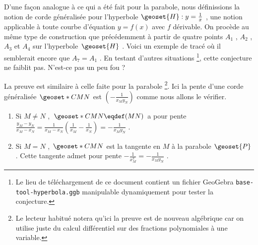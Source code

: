 D'une façon analogue à ce qui a été fait pour la parabole, nous définissions la notion de corde généralisée pour l'hyperbole $\geoset{H} : y = \frac{1}{x}$ , une notion applicable à toute courbe d'équation $y = f(x)$ avec $f$ dérivable.
On procède au même type de construction que précédemment à partir de quatre points $A_1$ , $A_2$ , $A_3$ et $A_4$ sur l'hyperbole $\geoset{H}$ . Voici un exemple de tracé où il semblerait encore que $A_7 = A_1$ . En testant d'autres situations
\footnote{
	Le lieu de téléchargement de ce document contient un fichier GeoGebra \texttt{base-tool-hyperbola.ggb} manipulable dynamiquement pour tester la conjecture.
},
cette conjecture ne faiblit pas. N'est-ce pas un peu fou ?
 

\vspace{1em}

\begin{center}
\end{center}

\vspace{1em}

 
La preuve est similaire à celle faite pour la parabole
\footnote{
	Le lecteur habitué notera qu'ici la preuve est de nouveau algébrique car on utilise juste du calcul différentiel sur des fractions polynomiales à une variable.
}.
Ici la pente d'une corde généralisée $\geoset*{C}{MN}$ est $\left( - \frac{1}{x_M y_N} \right)$ comme nous allons le vérifier.
\begin{enumerate}
	\item Si $M \neq N$ , $\geoset*{C}{MN} \eqdef (MN)$ a pour pente $\frac{y_M - y_N}{x_M - x_N} = \frac{1}{x_M - x_N} \left( \frac{1}{x_M} - \frac{1}{x_N} \right) = - \frac{1}{x_M y_N}$ .

	\item Si $M = N$ , $\geoset*{C}{MN}$ est la tangente en $M$ à la parabole $\geoset{P}$ . Cette tangente admet pour pente $- \frac{1}{x_M^2} = - \frac{1}{x_M y_N}$ .
\end{enumerate}


